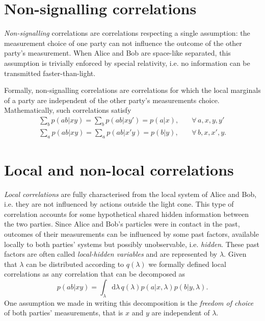 \section{Non-signalling correlations}

\textit{Non-signalling} correlations are correlations respecting a single assumption: the measurement choice of one party can not influence the outcome of the other party's measurement.
When Alice and Bob are space-like separated, this assumption is trivially enforced by special relativity, i.e. no information can be transmitted faster-than-light.

Formally, non-signalling correlations are correlations for which the local marginals of a party are independent of the other party's measurements choice. 
Mathematically, such correlations satisfy
\begin{align}
	\sum_b p(ab|xy) = \sum_b p(ab|xy') = p(a|x), \quad &\forall\,a,x,y,y' \\
	\sum_a p(ab|xy) = \sum_a p(ab|x'y) = p(b|y), \quad &\forall\,b,x,x',y.
	\label{eq:non-signalling}
\end{align}

\pagebreak 

\section{Local and non-local correlations}

\textit{Local correlations} are fully characterised from the local system of Alice and Bob, i.e. they are not influenced by actions outside the light cone.
This type of correlation accounts for some hypothetical shared hidden information between the two parties.
Since Alice and Bob's particles were in contact in the past, outcomes of their measurements can be influenced by some past factors, available locally to both parties' systems but possibly unobservable, i.e. \textit{hidden}.
These past factors are often called \textit{local-hidden variables} and are represented by $\lambda$.
Given that $\lambda$ can be distributed according to $q(\lambda)$ we formally defined local correlations as any correlation that can be decomposed as
\begin{equation}
	p(ab|xy) = \int_\lambda \mathrm{d}\lambda \, q(\lambda) p(a|x,\lambda) p(b|y,\lambda).
	\label{eq:local}
\end{equation}
One assumption we made in writing this decomposition is the \textit{freedom of choice} of both parties' measurements, that is $x$ and $y$ are independent of $\lambda$.

